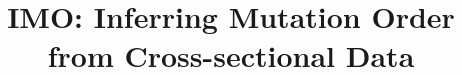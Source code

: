 \documentclass[]{article}
\title{IMO: Inferring Mutation Order from Cross-sectional Data}
\author{}
\begin{document}
	
	\maketitle
	
	
	\begin{abstract}
		
	\end{abstract}
	
	
	
	
	
	
	
	
	
	
	
	
	
\end{document}
